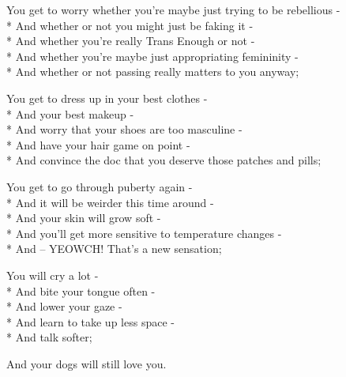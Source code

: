\documentclass[12pt,letterpaper,oneside]{memoir}
\begin{document}
  \vspace{1pc}
  \noindent
  You get to worry whether you're maybe just trying to be rebellious -\\*
  \hspace*{0.25cm} And whether or not you might just be faking it -\\*
  \hspace*{0.25cm} And whether you're really Trans Enough or not -\\*
  \hspace*{0.25cm} And whether you're maybe just appropriating femininity -\\*
  \hspace*{0.25cm} And whether or not passing really matters to you anyway;

  \vspace{1pc}
  \noindent
  You get to dress up in your best clothes -\\*
  \hspace*{0.25cm} And your best makeup -\\*
  \hspace*{0.25cm} And worry that your shoes are too masculine -\\*
  \hspace*{0.25cm} And have your hair game on point -\\*
  \hspace*{0.25cm} And convince the doc that you deserve those patches and pills;

  \vspace{1pc}
  \noindent
  You get to go through puberty again -\\*
  \hspace*{0.25cm} And it will be weirder this time around -\\*
  \hspace*{0.25cm} And your skin will grow soft -\\*
  \hspace*{0.25cm} And you'll get more sensitive to temperature changes -\\*
  \hspace*{0.25cm} And -- YEOWCH! That's a new sensation;

  \newpage
  \noindent
  You will cry a lot -\\*
  \hspace*{0.25cm} And bite your tongue often -\\*
  \hspace*{0.25cm} And lower your gaze -\\*
  \hspace*{0.25cm} And learn to take up less space -\\*
  \hspace*{0.25cm} And talk softer;

  \vspace{1pc}
  \noindent
  And your dogs will still love you.
\end{document}

